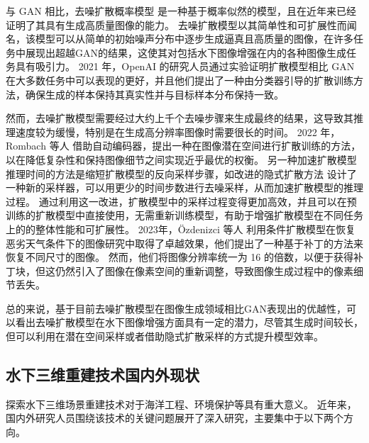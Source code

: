 与 GAN 相比，去噪扩散概率模型 \cite{pre_ddpm}\cite{ddpm}是一种基于概率似然的模型，且在近年来已经证明了其具有生成高质量图像的能力。
去噪扩散模型以其简单性和可扩展性而闻名，该模型可以从简单的初始噪声分布中逐步生成逼真且高质量的图像，在许多任务中展现出超越GAN的结果，这使其对包括水下图像增强在内的各种图像生成任务具有吸引力。
2021 年，OpenAI 的研究人员通过实验证明扩散模型相比 GAN 在大多数任务中可以表现的更好，并且他们提出了一种由分类器引导的扩散训练方法\cite{ddpm_beat_gan}，确保生成的样本保持其真实性并与目标样本分布保持一致。

然而，去噪扩散模型需要经过大约上千个去噪步骤来生成最终的结果，这导致其推理速度较为缓慢，特别是在生成高分辨率图像时需要很长的时间。
2022 年，Rombach 等人 \cite{latent}借助自动编码器，提出一种在图像潜在空间进行扩散训练的方法，以在降低复杂性和保持图像细节之间实现近乎最优的权衡。
另一种加速扩散模型推理时间的方法是缩短扩散模型的反向采样步骤，如改进的隐式扩散方法 \cite{improved_ddpm,ddim}设计了一种新的采样器，可以用更少的时间步数进行去噪采样，从而加速扩散模型的推理过程。
通过利用这一改进，扩散模型中的采样过程变得更加高效，并且可以在预训练的扩散模型中直接使用，无需重新训练模型，有助于增强扩散模型在不同任务上的的整体性能和可扩展性。
2023年，Özdenizci 等人 \cite{weather}利用条件扩散模型在恢复恶劣天气条件下的图像研究中取得了卓越效果，他们提出了一种基于补丁的方法来恢复不同尺寸的图像。
然而，他们将图像分辨率统一为 16 的倍数，以便于获得补丁块，但这仍然引入了图像在像素空间的重新调整，导致图像生成过程中的像素细节丢失。

总的来说，基于目前去噪扩散模型在图像生成领域相比GAN表现出的优越性，可以看出去噪扩散模型在水下图像增强方面具有一定的潜力，尽管其生成时间较长，但可以利用在潜在空间采样或者借助隐式扩散采样的方式提升模型效率。

\subsection{水下三维重建技术国内外现状}
探索水下三维场景重建技术对于海洋工程、环境保护等具有重大意义。
近年来，国内外研究人员围绕该技术的关键问题展开了深入研究，主要集中于以下两个方向。

